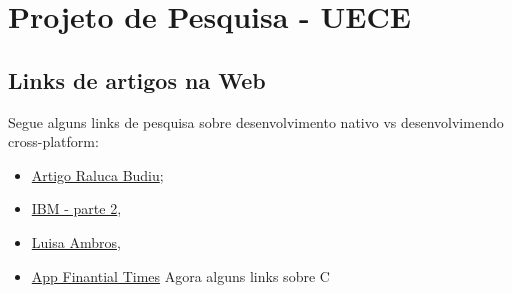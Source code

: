 \documentclass[a4paper,12pt]{article}
\begin{document}
	\section{Projeto de Pesquisa - UECE} %
	\label{sec:projeto_de_pesquisa_uece}
		\subsection{Links de artigos na Web} %
		\label{sub:links_de_artigos_na_web}
		Segue alguns links de pesquisa sobre desenvolvimento nativo vs desenvolvimendo cross-platform:
		\begin{itemize}
			\item \href{http://www.nngroup.com/articles/mobile-native-apps/}{Artigo Raluca Budiu};
			\item \href{https://www.ibm.com/developerworks/community/blogs/ctaurion/entry/desenvolvimento_de_apps-parte_2_hibrido_nativo_ou_web?lang=en}{IBM - parte 2},
			\item \href{http://luisaambros.com/blog/diferenca-entre-aplicativos-nativos-hibridos-e-mobile-web-apps/}{Luisa Ambros},
			\item \href{http://techcrunch.com/2011/06/07/ft-bypasses-apples-itunes-launches-html5-web-app-free-access-first-week/}{App Finantial Times} 
			Agora alguns links sobre C
		\end{itemize}	
\end{document}
